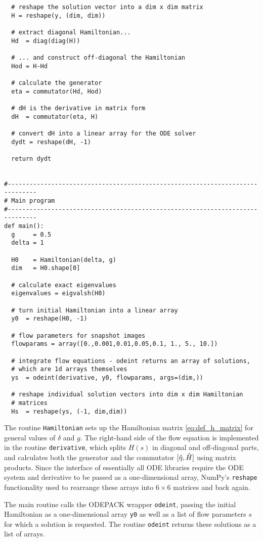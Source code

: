 {\begin{lstlisting}
  # reshape the solution vector into a dim x dim matrix
  H = reshape(y, (dim, dim))

  # extract diagonal Hamiltonian...
  Hd  = diag(diag(H))

  # ... and construct off-diagonal the Hamiltonian
  Hod = H-Hd

  # calculate the generator
  eta = commutator(Hd, Hod)

  # dH is the derivative in matrix form 
  dH  = commutator(eta, H)

  # convert dH into a linear array for the ODE solver
  dydt = reshape(dH, -1)
    
  return dydt


#------------------------------------------------------------------------------
# Main program
#------------------------------------------------------------------------------
def main():
  g     = 0.5
  delta = 1

  H0    = Hamiltonian(delta, g)
  dim   = H0.shape[0]

  # calculate exact eigenvalues
  eigenvalues = eigvalsh(H0)

  # turn initial Hamiltonian into a linear array
  y0  = reshape(H0, -1)                 

  # flow parameters for snapshot images
  flowparams = array([0.,0.001,0.01,0.05,0.1, 1., 5., 10.])

  # integrate flow equations - odeint returns an array of solutions,
  # which are 1d arrays themselves
  ys  = odeint(derivative, y0, flowparams, args=(dim,))

  # reshape individual solution vectors into dim x dim Hamiltonian
  # matrices
  Hs  = reshape(ys, (-1, dim,dim))
\end{lstlisting}


The routine \texttt{Hamiltonian} sets up the Hamiltonian matrix \eqref{eq:def_h_matrix}
for general values of $\delta$ and $g$. The right-hand side of the flow equation
is implemented in the routine \texttt{derivative}, which splits $H(s)$
in diagonal and off-diagonal parts, and calculates both the generator and
the commutator $[{\hat{\eta}},{\hat{H}}]$ using matrix products. Since the
interface of essentially all ODE libraries require the ODE system and
derivative to be passed as a one-dimensional array, NumPy's \texttt{reshape}
functionality used to rearrange these arrays into $6\times 6$ matrices 
and back again.

The main routine calls the ODEPACK wrapper \texttt{odeint}, passing 
the initial Hamiltonian as a one-dimensional array \texttt{y0} as well
as a list of flow parameters $s$ for which a solution is requested. The 
routine \texttt{odeint} returns these solutions as a list of arrays.

}
